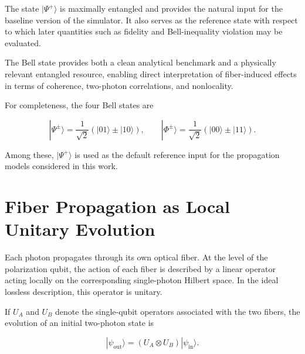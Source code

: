 \medskip

The state \( |\Psi^+\rangle \) is maximally entangled and provides the natural input for the baseline version of the simulator. It also serves as the reference state with respect to which later quantities such as fidelity and Bell-inequality violation may be evaluated.

\medskip

The Bell state provides both a clean analytical benchmark and a physically relevant entangled resource, enabling direct interpretation of fiber-induced effects in terms of coherence, two-photon correlations, and nonlocality.

\medskip

For completeness, the four Bell states are

\begin{equation}
|\Psi^{\pm}\rangle
=
\frac{1}{\sqrt{2}}
\left(
|01\rangle \pm |10\rangle
\right),
\qquad
|\Phi^{\pm}\rangle
=
\frac{1}{\sqrt{2}}
\left(
|00\rangle \pm |11\rangle
\right).
\label{eq:bell_state_basis}
\end{equation}

Among these, \( |\Psi^+\rangle \) is used as the default reference input for the propagation models considered in this work.


\section{Fiber Propagation as Local Unitary Evolution}

Each photon propagates through its own optical fiber. At the level of the polarization qubit, the action of each fiber is described by a linear operator acting locally on the corresponding single-photon Hilbert space. In the ideal lossless description, this operator is unitary.

\medskip

If \( U_A \) and \( U_B \) denote the single-qubit operators associated with the two fibers, the evolution of an initial two-photon state is

\begin{equation}
|\psi_{\mathrm{out}}\rangle
=
\left(
U_A \otimes U_B
\right)
|\psi_{\mathrm{in}}\rangle.
\label{eq:local_unitary_state_evolution}
\end{equation}

